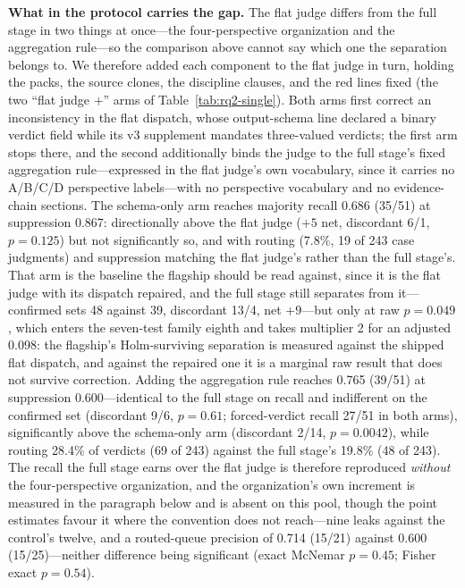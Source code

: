 \documentclass[acmsmall,screen,review,anonymous]{acmart}
\begin{document}
\textbf{What in the protocol carries the gap.} The flat judge differs from the full stage in two things at once---the four-perspective organization and the aggregation rule---so the comparison above cannot say which one the separation belongs to. We therefore added each component to the flat judge in turn, holding the packs, the source clones, the discipline clauses, and the red lines fixed (the two ``flat judge $+$'' arms of Table~\ref{tab:rq2-single}). Both arms first correct an inconsistency in the flat dispatch, whose output-schema line declared a binary verdict field while its v3 supplement mandates three-valued verdicts; the first arm stops there, and the second additionally binds the judge to the full stage's fixed aggregation rule---expressed in the flat judge's own vocabulary, since it carries no A/B/C/D perspective labels---with no perspective vocabulary and no evidence-chain sections. The schema-only arm reaches majority recall 0.686 (35/51) at suppression 0.867: directionally above the flat judge ($+5$ net, discordant 6/1, $p{=}0.125$) but not significantly so, and with routing (7.8\%, 19 of 243 case judgments) and suppression matching the flat judge's rather than the full stage's. That arm is the baseline the flagship should be read against, since it is the flat judge with its dispatch repaired, and the full stage still separates from it---confirmed sets 48 against 39, discordant 13/4, net $+9$---but only at raw $p{=}0.049$, which enters the seven-test family eighth and takes multiplier 2 for an adjusted 0.098: the flagship's Holm-surviving separation is measured against the shipped flat dispatch, and against the repaired one it is a marginal raw result that does not survive correction. Adding the aggregation rule reaches 0.765 (39/51) at suppression 0.600---identical to the full stage on recall and indifferent on the confirmed set (discordant 9/6, $p{=}0.61$; forced-verdict recall 27/51 in both arms), significantly above the schema-only arm (discordant 2/14, $p{=}0.0042$), while routing 28.4\% of verdicts (69 of 243) against the full stage's 19.8\% (48 of 243). The recall the full stage earns over the flat judge is therefore reproduced \emph{without} the four-perspective organization, and the organization's own increment is measured in the paragraph below and is absent on this pool, though the point estimates favour it where the convention does not reach---nine leaks against the control's twelve, and a routed-queue precision of 0.714 (15/21) against 0.600 (15/25)---neither difference being significant (exact McNemar $p{=}0.45$; Fisher exact $p{=}0.54$).
\end{document}
